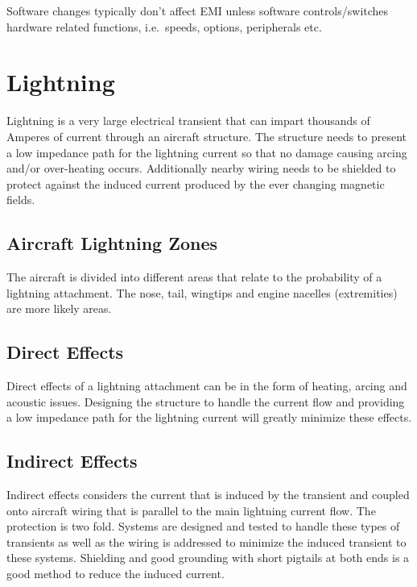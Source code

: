 \documentclass[
]{book}
\begin{document}
Software changes typically don't affect EMI unless software controls/switches
hardware related functions, i.e.~speeds, options, peripherals etc.

\hypertarget{lightning}{%
\section{Lightning}\label{lightning}}

Lightning is a very large electrical transient that can impart thousands of
Amperes of current through an aircraft structure. The structure needs to present
a low impedance path for the lightning current so that no damage causing arcing
and/or over-heating occurs. Additionally nearby wiring needs to be shielded to
protect against the induced current produced by the ever changing magnetic
fields.

\hypertarget{aircraft-lightning-zones}{%
\subsection{Aircraft Lightning Zones}\label{aircraft-lightning-zones}}

The aircraft is divided into different areas that relate to the probability of a
lightning attachment. The nose, tail, wingtips and engine nacelles (extremities)
are more likely areas.

\hypertarget{direct-effects}{%
\subsection{Direct Effects}\label{direct-effects}}

Direct effects of a lightning attachment can be in the form of heating, arcing
and acoustic issues. Designing the structure to handle the current flow and
providing a low impedance path for the lightning current will greatly minimize
these effects.

\hypertarget{indirect-effects}{%
\subsection{Indirect Effects}\label{indirect-effects}}

Indirect effects considers the current that is induced by the transient and
coupled onto aircraft wiring that is parallel to the main lightning current
flow. The protection is two fold. Systems are designed and tested to handle
these types of transients as well as the wiring is addressed to minimize the
induced transient to these systems. Shielding and good grounding with short
pigtails at both ends is a good method to reduce the induced current.
\end{document}
